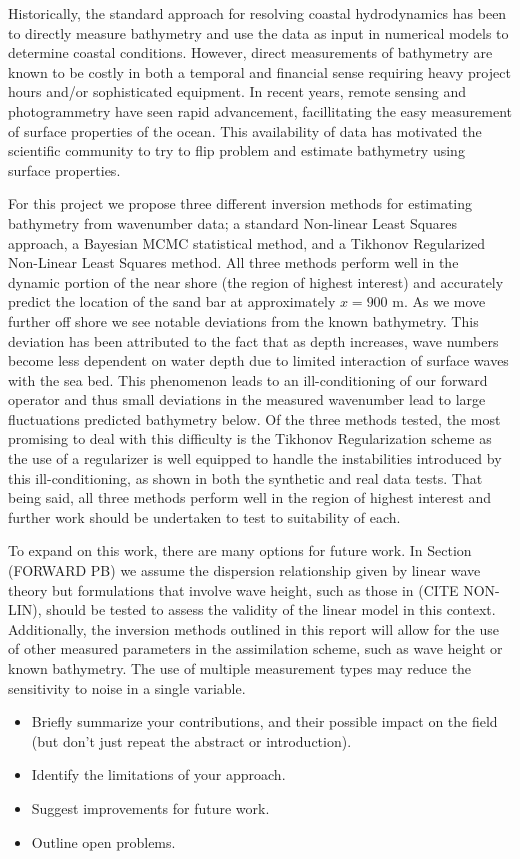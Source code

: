 Historically, the standard approach for resolving coastal hydrodynamics has been to directly measure bathymetry and use the data as input in numerical models to determine coastal conditions. However, direct measurements of bathymetry are known to be costly in both a temporal and financial sense requiring heavy project hours and/or sophisticated equipment. In recent years, remote sensing and photogrammetry have seen rapid advancement, facillitating the easy measurement of surface properties of the ocean. This availability of data has motivated the scientific community to try to flip problem and estimate bathymetry using surface properties.

For this project we propose three different inversion methods for estimating bathymetry from wavenumber data; a standard Non-linear Least Squares approach, a Bayesian MCMC statistical method, and a Tikhonov Regularized Non-Linear Least Squares method. All three methods perform well in the dynamic portion of the near shore (the region of highest interest) and accurately predict the location of the sand bar at approximately $x = 900$ m. As we move further off shore we see notable deviations from the known bathymetry. This deviation has been attributed to the fact that as depth increases, wave numbers become less dependent on water depth due to limited interaction of surface waves with the sea bed. This phenomenon leads to an ill-conditioning of our forward operator and thus small deviations in the measured wavenumber lead to large fluctuations predicted bathymetry below. Of the three methods tested, the most promising to deal with this difficulty is the Tikhonov Regularization scheme as the use of a regularizer is well equipped to handle the instabilities introduced by this ill-conditioning, as shown in both the synthetic and real data tests. That being said, all three methods perform well in the region of highest interest and further work should be undertaken to test to suitability of each.

To expand on this work, there are many options for future work. In Section (FORWARD PB) we assume the dispersion relationship given by linear wave theory but formulations that involve wave height, such as those in (CITE NON-LIN), should be tested to assess the validity of the linear model in this context. Additionally, the inversion methods outlined in this report will allow for the use of other measured parameters in the assimilation scheme, such as wave height or known bathymetry. The use of multiple measurement types may reduce the sensitivity to noise in a single variable. 


\begin{itemize}
\item Briefly summarize your contributions, and their possible
impact on the field (but don't just repeat the abstract or introduction).
\item Identify the limitations of your approach.
\item Suggest improvements for future work.
\item Outline open problems.
\end{itemize}

